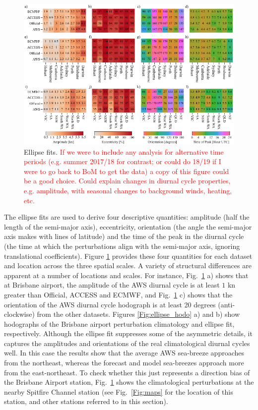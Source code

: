 \documentclass[alpha-refs]{wiley-article}
\begin{document}
\begin{figure}
\centering
\includegraphics{ellipse_fits.pdf}
\caption{Ellipse fits. \textcolor{red}{If we were to include any analysis for alternative time periods (e.g. summer 2017/18 for contrast; or could do 18/19 if I were to go back to BoM to get the data) a copy of this figure could be a good choice. Could explain changes in diurnal cycle properties, e.g. amplitude, with seasonal changes to background winds, heating, etc.}}
\label{Fig:ellipse_fits}
\end{figure}

The ellipse fits are used to derive four descriptive quantities: amplitude (half the length of the semi-major axis), eccentricity, orientation (the angle the semi-major axis makes with lines of latitude) and the time of the peak in the diurnal cycle (the time at which the perturbations align with the semi-major axis, ignoring translational coefficients). Figure \ref{Fig:ellipse_fits} provides these four quantities for each dataset and location across the three spatial scales. A variety of structural differences are apparent at a number of locations and scales. For instance, Fig.~\ref{Fig:ellipse_fits} a) shows that at Brisbane airport, the amplitude of the AWS diurnal cycle is at least $1$ kn greater than Official, ACCESS and ECMWF, and Fig.~\ref{Fig:ellipse_fits} c) shows that the orientation of the AWS diurnal cycle hodograph is at least 20 degrees (anti-clockwise) from the other datasets. Figures \ref{Fig:ellipse_hodo} a) and b) show hodographs of the Brisbane airport perturbation climatology and ellipse fit, respectively. Although the ellipse fit suppresses some of the asymmetric details, it captures the amplitudes and orientations of the real climatological diurnal cycles well. In this case the results show that the average AWS sea-breeze approaches from the northeast, whereas the forecast and model sea-breezes approach more from the east-northeast. To check whether this just represents a direction bias of the Brisbane Airport station, Fig.~\ref{Fig:ellipse_fits} shows the climatological perturbations at the nearby Spitfire Channel station (see Fig.~\ref{Fig:maps} for the location of this station, and other stations referred to in this section).   
\end{document}
